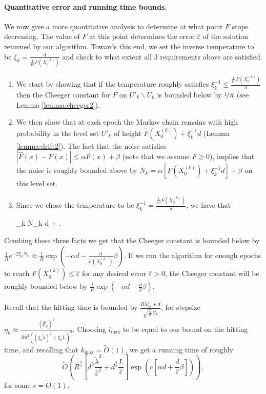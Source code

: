 \documentclass[final,12pt]{colt2018} %
\renewcommand{\epsilon}{\varepsilon}
\def \be{\begin{equs}}
\def \ee{\end{equs}}
\begin{document}
{\vspace{-2mm}
\paragraph{Quantitative error and running time bounds.} 
  We  now give a more quantitative analysis to determine at what point $F$ stops decreasing. 
   The value of $F$ at this point  determines the error $\hat{\epsilon}$  of the solution returned by our algorithm.
%
Towards this end, we set the inverse temperature to be $\xi_k = \frac{d}{\frac{1}{10}F(X^{(k)}_0)}$ and  check to what extent all 3 requirements above are satisfied.
%
\begin{enumerate}
\item We start by showing that if the temperature roughly satisfies $\xi_k^{-1} \leq \frac{\frac{1}{10}F(X^{(k)}_0)}{d}$ then the Cheeger constant for $F$ on $U'_k\backslash U_k$ is bounded below by $\nicefrac{1}{R}$ (see Lemma \ref{lemma:cheeger2}).
%
\item   We then show that at each epoch the Markov chain remains with high probability in the level set $U'_k$ of height $\hat{F}(X^{(k)}_0) + \xi_k^{-1}d$  (Lemma \ref{lemma:drift2}).  The fact that the noise satisfies $|\hat{F}(x)-F(x)| \leq \alpha F(x) + \beta$ (note that we assume $F \geq 0$),  implies that the noise is roughly bounded above by $N_k = \alpha[F(X^{(k)}_0) + \xi_k^{-1}d]+\beta$ on this level set.
%
\item Since we chose the temperature to be $\xi_k^{-1} = \frac{\frac{1}{10}F(X^{(k)}_0)}{d}$, we have that
 \be
 \xi_k N_k
 \approx \alpha d + \beta.
 \ee
\end{enumerate}
Combing these three facts we get that the Cheeger constant is bounded below by $\frac{1}{R} e^{-2\xi_k N_k} \approx \frac{1}{R} \exp\left(-\alpha d - \frac{d}{F(X^{(k)}_0)}\beta\right)$.
%
If we run the algorithm for enough epochs to reach $F(X^{(k)}_0) \leq \hat{\varepsilon}$ for any desired error $\hat{\varepsilon}>0$, the Cheeger constant will be roughly bounded below by $\frac{1}{R} \exp(-\alpha d - \frac{d}{\hat{\varepsilon}}\beta)$.

Recall that the hitting time is bounded by $\frac{R \tilde{\lambda} \xi_k + d}{\sqrt{\frac{\eta_k}{d}} \hat{\mathcal{C}}_k}$, for stepsize $\eta_k \approx \frac{(\hat{\mathcal{C}}_k)^2}{R d^3((\xi_k \tilde{\lambda})^2 + \xi_k L)^2}$. 
%
 Choosing $i_{\textrm{max}}$ to be equal to our bound on the hitting time, and recalling that  $k_{\mathrm{max}} = \tilde{O}(1)$, we get a running time of roughly 
$$\tilde{O}\left(R^{\frac{3}{2}}\left[d^5
\frac{\tilde{\lambda}^3}{\hat{\varepsilon}^3} + d^{\frac{5}{2}}
\frac{L}{\hat{\varepsilon}}\right]\exp(c[\alpha d + \frac{d}{\hat{\varepsilon}}\beta])\right),$$
 for some $c = \tilde{O}(1).$




}
\end{document}
